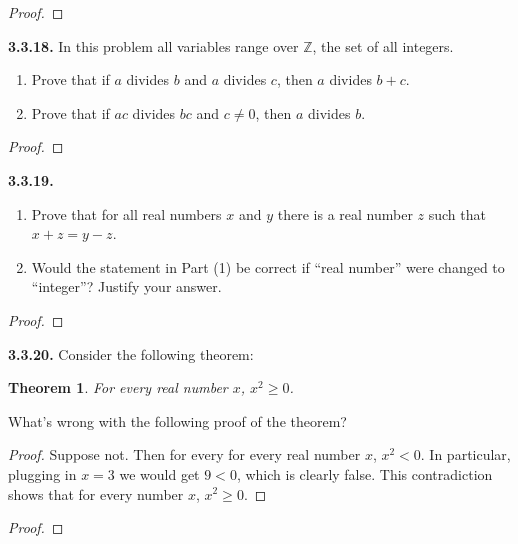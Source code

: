 \documentclass[12pt]{amsart}
\newenvironment{statement}[1]{\smallskip\noindent\color[rgb]{.6627, .3529, .6314} {\bf #1.}}{}
\newtheorem{theorem}{Theorem}
\theoremstyle{definition}
\theoremstyle{remark}
\newcommand{\BZ}{\mathbb Z}
\begin{document}
\begin{proof}
\end{proof}


\begin{statement}{3.3.18}
In this problem all variables range over $\BZ$, the set of all integers.
\begin{enumerate}
	\item Prove that if $a$ divides $b$ and $a$ divides $c$, then $a$ divides $b + c$.
	
	\item Prove that if $ac$ divides $bc$ and $c \neq 0$, then $a$ divides $b$.
\end{enumerate}
\end{statement}

\begin{proof}
\end{proof}


\begin{statement}{3.3.19}
\begin{enumerate}
	\item Prove that for all real numbers $x$ and $y$ there is a real number $z$ such that
	$x + z = y - z$.
	
	\item Would the statement in Part (1) be correct if ``real number'' were changed to ``integer''?
	Justify your answer.
\end{enumerate}
\end{statement}

\begin{proof}
\end{proof}


\begin{statement}{3.3.20}
Consider the following theorem:
\begin{theorem}
	For every real number $x$, $x^2 \geq 0$.
\end{theorem}
What's wrong with the following proof of the theorem?
\begin{proof}
	Suppose not.
	Then for every for every real number $x$, $x^2 < 0$.
	In particular, plugging in $x = 3$ we would get $9 < 0$, which is clearly false.
	This contradiction shows that for every number $x$, $x^2 \geq 0$.
\end{proof}
\end{statement}

\begin{proof}
\end{proof}
\end{document}
